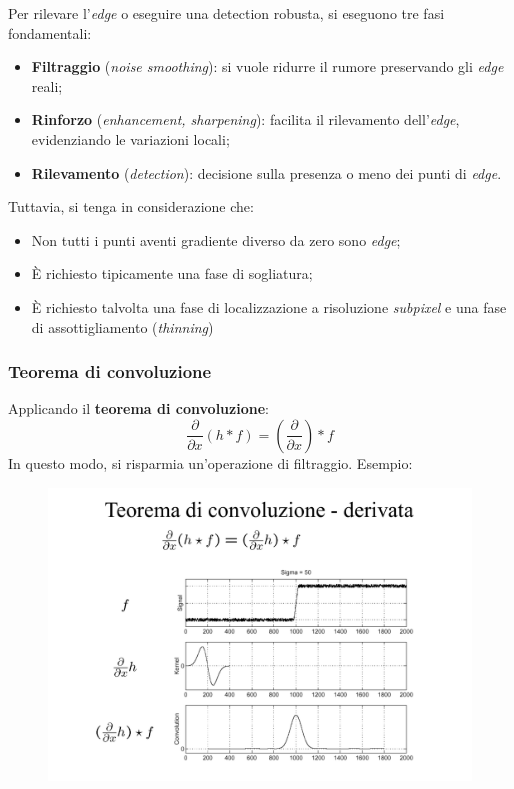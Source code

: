 \documentclass[a4paper]{article}
\begin{document}
	Per rilevare l'\emph{edge} o eseguire una detection robusta, si eseguono tre fasi fondamentali:
	\begin{itemize}
		\item \textbf{Filtraggio} (\emph{noise smoothing}): si vuole ridurre il rumore preservando gli \emph{edge} reali;
		
		\item \textbf{Rinforzo} (\emph{enhancement, sharpening}): facilita il rilevamento dell'\emph{edge}, evidenziando le variazioni locali;
		
		\item \textbf{Rilevamento} (\emph{detection}): decisione sulla presenza o meno dei punti di \emph{edge}.
	\end{itemize}
	Tuttavia, si tenga in considerazione che:
	\begin{itemize}[label=]
		\item Non tutti i punti aventi gradiente diverso da zero sono \emph{edge};
		\item È richiesto tipicamente una fase di sogliatura;
		\item È richiesto talvolta una fase di localizzazione a risoluzione \emph{subpixel} e una fase di assottigliamento (\emph{thinning})
	\end{itemize}\newpage

	\subsubsection{Teorema di convoluzione}
	
	Applicando il \textbf{teorema di convoluzione}:
	\begin{equation*}
		\dfrac{\partial}{\partial x}\left(h * f\right) = \left(\dfrac{\partial}{\partial x}\right) * f
	\end{equation*}
	In questo modo, si risparmia un'operazione di filtraggio. Esempio:
	\begin{figure}[!htp]
		\centering
		\includegraphics[width=\textwidth]{img/convoluzione_derivata_prima.pdf}
	\end{figure}\newpage
\end{document}
